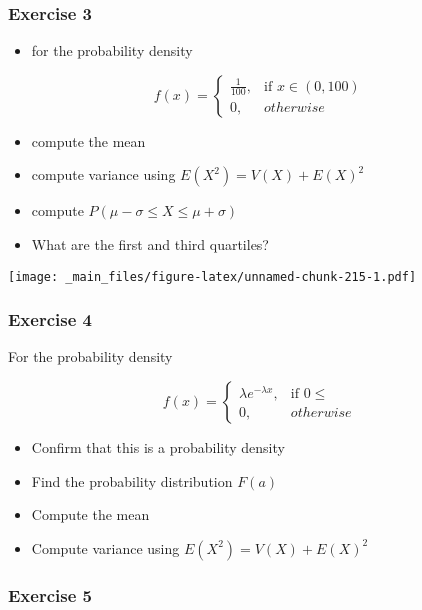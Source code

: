\documentclass[
]{book}
\providecommand{\tightlist}{%
  \setlength{\itemsep}{0pt}\setlength{\parskip}{0pt}}
\begin{document}
\hypertarget{exercise-3-1}{%
\subsubsection{Exercise 3}\label{exercise-3-1}}

\begin{itemize}
\tightlist
\item
  for the probability density
\end{itemize}

\[
    f(x)= 
\begin{cases}
    \frac{1}{100},& \text{if } x\in (0,100)\\
    0,& otherwise 
\end{cases}
\]

\begin{itemize}
\tightlist
\item
  compute the mean
\item
  compute variance using \(E(X^2)=V(X)+E(X)^2\)
\item
  compute \(P(\mu-\sigma\leq X \leq \mu+\sigma)\)
\item
  What are the first and third quartiles?
\end{itemize}

\texttt{[image: \_main\_files/figure-latex/unnamed-chunk-215-1.pdf]}

\hypertarget{exercise-4-1}{%
\subsubsection{Exercise 4}\label{exercise-4-1}}

For the probability density

\[
    f(x)= 
\begin{cases}
    \lambda e^{-\lambda x},& \text{if } 0 \leq\\
    0,& otherwise 
\end{cases}
\]

\begin{itemize}
\tightlist
\item
  Confirm that this is a probability density
\item
  Find the probability distribution \(F(a)\)
\item
  Compute the mean
\item
  Compute variance using \(E(X^2)=V(X)+E(X)^2\)
\end{itemize}

\hypertarget{exercise-5-1}{%
\subsubsection{Exercise 5}\label{exercise-5-1}}
\end{document}
